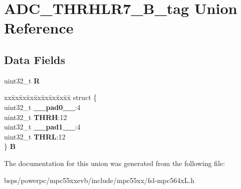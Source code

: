\hypertarget{unionADC__THRHLR7__32B__tag}{}\section{A\+D\+C\+\_\+\+T\+H\+R\+H\+L\+R7\+\_\+B\+\_\+tag Union Reference}
\label{unionADC__THRHLR7__32B__tag}
\subsection*{Data Fields}
\begin{DoxyCompactItemize}
\item 
\mbox{\label{unionADC__THRHLR7__32B__tag_aa706e7683591e172b7de663a23ea357d}} 
uint32\+\_\+t {\bfseries R}
\item 
\mbox{\label{unionADC__THRHLR7__32B__tag_a3a1b96fee3f9b1087dd9e174a0108a4e}} 
\begin{tabbing}
xx\=xx\=xx\=xx\=xx\=xx\=xx\=xx\=xx\=\kill
struct \{\\
\>uint32\_t {\bfseries \_\_pad0\_\_}:4\\
\>uint32\_t {\bfseries THRH}:12\\
\>uint32\_t {\bfseries \_\_pad1\_\_}:4\\
\>uint32\_t {\bfseries THRL}:12\\
\} {\bfseries B}\\

\end{tabbing}\end{DoxyCompactItemize}


The documentation for this union was generated from the following file\+:\begin{DoxyCompactItemize}
\item 
bsps/powerpc/mpc55xxevb/include/mpc55xx/fsl-\/mpc564x\+L.\+h\end{DoxyCompactItemize}
